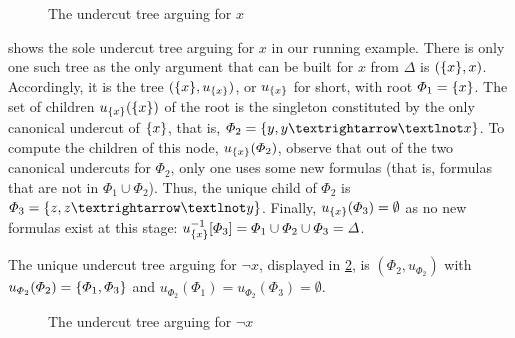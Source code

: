 \documentclass[version=3.21, pagesize, twoside=off, bibliography=totoc, DIV=calc, fontsize=12pt, a4paper, french, english]{scrartcl}
\begin{document}
\begin{figure}
	\caption{The undercut tree arguing for $x$}
	\label{fig:utx}
\end{figure}
\begin{example}
	\label{ex:abstUnder}
	 shows the sole undercut tree arguing for $x$ in our running example. There is only one such tree as the only argument that can be built for $x$ from $\Delta$ is $(\{x\}, x)$. Accordingly, it is the tree $(\{x\}, u_{\{x\}})$, or $u_{\{x\}}$ for short, with root $\Phi_1 = \{x\}$. The set of children $u_{\{x\}}(\{x\})$ of the root is the singleton constituted by the only canonical undercut of $\{x\}$, that is, $\Phi_2 = \set{y, y → ¬x}$. 
	To compute the children of this node, $u_{\{x\}}(\Phi_2)$, observe that out of the two canonical undercuts for $\Phi_2$, only one uses some new formulas (that is, formulas that are not in $\Phi_1 \cup \Phi_2$). Thus, the unique child of $\Phi_2$ is $\Phi_3 = \set{z, z → ¬y}$. 
	Finally, $u_{\{x\}}(\Phi_3) = \emptyset$ as no new formulas exist at this stage: $u_{\{x\}}^{-1}[\Phi_3] = \Phi_1 \cup \Phi_2 \cup \Phi_3 = \Delta$.
	
	The unique undercut tree arguing for $¬x$, displayed in \cref{fig:utnx}, is $(\Phi_2, u_{\Phi_2})$ with $u_{\Phi_2}(\Phi_2) = \{\Phi_1, \Phi_3\}$ and $u_{\Phi_2}(\Phi_1) = u_{\Phi_2}(\Phi_3) = \emptyset$.
\end{example}
\begin{figure}
	\caption{The undercut tree arguing for $¬x$}
	\label{fig:utnx}
\end{figure}
\end{document}
